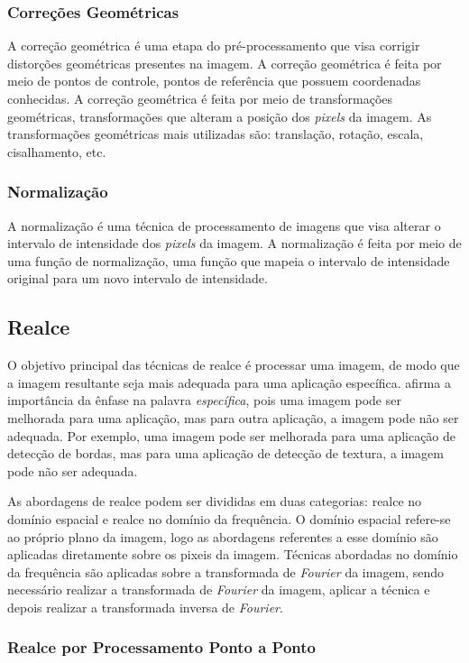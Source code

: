 \documentclass[conference]{IEEEtran}
\begin{document}
\subsubsection{Correções Geométricas}
A correção geométrica é uma etapa do pré-processamento que visa corrigir distorções geométricas presentes na imagem. 
A correção geométrica é feita por meio de pontos de controle, pontos de referência que possuem coordenadas 
conhecidas. A correção geométrica é feita por meio de transformações geométricas, transformações que alteram a 
posição dos \emph{pixels} da imagem. As transformações geométricas mais utilizadas são: translação, rotação, escala,
cisalhamento, etc.

\subsubsection{Normalização}
A normalização é uma técnica de processamento de imagens que visa alterar o intervalo de intensidade 
dos \emph{pixels} da imagem. A normalização é feita por meio de uma função de normalização, 
uma função que mapeia o intervalo de intensidade original para um novo intervalo de intensidade.

\subsection{Realce}

O objetivo principal das técnicas de realce é processar uma imagem, de modo que a imagem resultante seja mais 
adequada para uma aplicação específica. \cite{gonzalez2000} afirma a importância da ênfase na palavra 
\emph{específica}, pois uma imagem pode ser melhorada para uma aplicação, mas para outra aplicação, 
a imagem pode não ser adequada. Por exemplo, uma imagem pode ser melhorada para uma aplicação de detecção de bordas, 
mas para uma aplicação de detecção de textura, a imagem pode não ser adequada. 

As abordagens de realce podem ser divididas em duas categorias: realce no domínio espacial e realce no domínio da 
frequência. O domínio espacial refere-se ao próprio plano da imagem, logo as abordagens referentes a esse domínio 
são aplicadas diretamente sobre os pixeis da imagem. Técnicas abordadas no domínio da frequência são aplicadas 
sobre a transformada de \emph{Fourier} da imagem, sendo necessário realizar a transformada de \emph{Fourier} da 
imagem, aplicar a técnica e depois realizar a transformada inversa de \emph{Fourier}. 

\subsubsection{Realce por Processamento Ponto a Ponto}
\end{document}
